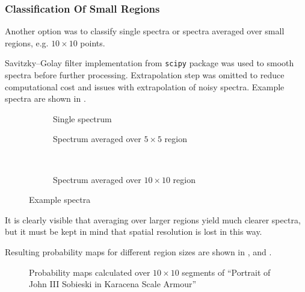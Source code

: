 \subsubsection{Classification Of Small Regions}
Another option was to classify single spectra or spectra averaged over small regions, e.g. $10\times10$ points. 

Savitzky–Golay filter implementation from \texttt{scipy} package was used to smooth spectra before further processing. Extrapolation step was omitted to reduce computational cost and issues with extrapolation of noisy spectra.
Example spectra are shown in .

\begin{figure}[H]
    \begin{subfigure}{.5\linewidth}
        \centering
        
        \caption{Single spectrum }
        \label{fig:sub1}
    \end{subfigure}%
    \begin{subfigure}{.5\linewidth}
        \centering
        
        \caption{Spectrum averaged over $5\times5$ region}
        \label{fig:sub2}
    \end{subfigure}\\[1ex]
    \centering
    \begin{subfigure}{0.5\linewidth}
        \centering
        
        \caption{Spectrum averaged over $10\times10$ region}
        \label{fig:sub3}
    \end{subfigure}
    \caption{Example spectra}
    \label{fig:spectra}
\end{figure}

It is clearly visible that averaging over larger regions yield much clearer spectra, but it must be kept in mind that spatial resolution is lost in this way.

Resulting probability maps for different region sizes are shown in ,  and .

\begin{figure}[htbp!]
  \centering
  
  \caption{Probability maps calculated over $10\times10$ segments of ``Portrait of John III Sobieski in Karacena Scale Armour''}
  \label{fig:10x10-point-sobieski}
\end{figure}

